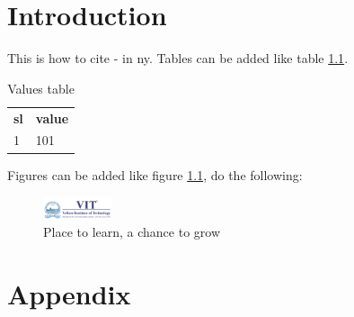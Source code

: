 \documentclass{capstone-project}
\begin{document}


\chapter{Introduction}

This is how to cite - \cite{einstein} in \ac{ny}.
Tables can be added like table \ref{tab:table1}.
\begin{table}[h]
    \begin{tabular}{ll}
        \textbf{sl} & \textbf{value} \\
        1           & 101            \\
    \end{tabular}
    \captionsetup{singlelinecheck = false, format= hang, justification=raggedright, font=footnotesize, labelsep=space}
    \caption{Values table}
    \label{tab:table1}
\end{table}
Figures can be added like figure \ref{fig:figure1}, do the following:
\begin{figure}[h]
    \centering
    \includegraphics[width=2cm]{assets/university.png}
    \caption{Place to learn, a chance to grow}
    \label{fig:figure1}
\end{figure}



\appendix
\chapter{Appendix}
\end{document}
